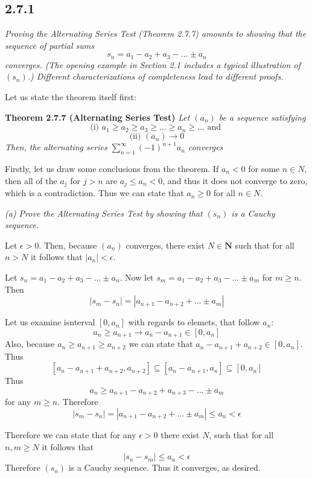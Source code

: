 \documentclass[11pt,oneside,titlepage]{book}
\begin{document}
\subsection*{2.7.1}
\textit{Proving the Alternating Series Test (Theorem 2.7.7) amounts to
  showing that the sequence of partial sums }
$$s_n  = a_1 - a_2 + a_3 - ... \pm a_n$$
\textit{converges. (The opening example in Section 2.1 includes a
  typical illustration of $(s_n)$.) Different characterizations of
  completeness lead to different proofs.}

Let us state the theorem itself first:

\textbf{Theorem 2.7.7 (Alternating Series Test)}
\textit{Let $(a_n)$ be a sequence satisfying}
$$\text{(i) } a_1 \geq a_2 \geq a_3 \geq ... \geq a_n \geq ... \text{ and }$$
$$\text{(ii) } (a_n) \to 0$$
\textit{Then, the alternating series $\sum_{n = 1}^{\infty}(-1)^{n + 1} a_n$
converges}

Firstly, let us draw some conclusions from the theorem. If $a_n < 0$ for
some $n \in N$, then all of the $a_j$ for $j > n$ are $a_j \leq a_n < 0$, and
thus it does not converge to zero, which is a contradiction. Thus we
can state that $a_n \geq 0$ for all $n \in N$.

\textit{(a) Prove the Alternating Series Test by showing that $(s_n)$ is a
  Cauchy sequence.}


Let $\epsilon > 0$. Then, because $(a_n)$ converges, there exist
$N \in \textbf{N}$ such that for all $n > N$ it follows that
$|a_n| < \epsilon$.

Let $s_n = a_1 - a_2 + a_3 - ... \pm a_n$. Now let
$s_m = a_1 - a_2 + a_3 - ... \pm a_m$ for $m \geq n$. Then
$$|s_m - s_n| = |a_{n + 1} - a_{n + 2} + ... \pm a_m|$$

Let us examine isnterval $[0, a_n]$ with regards to elemets, that follow $a_n$:
$$a_n \geq a_{n + 1} \to a_n - a_{n + 1} \in [0, a_n]$$
Also, because $a_n \geq a_{n + 1} \geq a_{n + 2}$ we can state that
$a_n - a_{n + 1} + a_{n + 2} \in [0, a_n]$.  Thus
$$[a_n - a_{n + 1} + a_{n + 2}, a_{n + 2}] \subseteq
[a_n - a_{n + 1}, a_n] \subseteq [0, a_n]$$
Thus
$$ a_n \geq a_{n + 1} - a_{n + 2} + a_{n + 3} - ... \pm a_m$$
for any $m \geq n$.
Therefore
$$|s_m - s_n| = |a_{n + 1} - a_{n + 2} + ... \pm a_m| \leq a_n < \epsilon$$


Therefore we can state that for any $\epsilon > 0$ there exist $N$, such that for all
$n, m \geq N$ it follows that
$$|s_n - s_m| \leq a_n < \epsilon$$
Therefore $(s_n)$ is a Cauchy sequence. Thus it converges, as desired.
\end{document}

